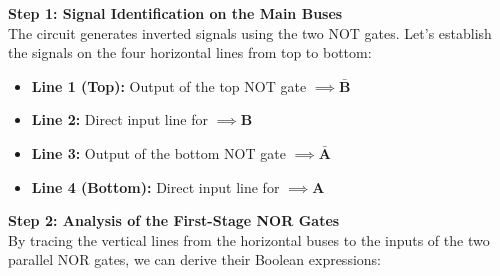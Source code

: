 \documentclass[12pt, a4paper]{article}
\begin{document}
																																																																																																																		\newpage %
																																																																																																																	
																																																																																																																		\begin{solutionbox}
																																																																																																																		    \textbf{Step 1: Signal Identification on the Main Buses} \\
																																																																																																																		        The circuit generates inverted signals using the two NOT gates. Let's establish the signals on the four horizontal lines from top to bottom:
																																																																																																																			    \begin{itemize}[itemsep=0.2em]
																																																																																																																			            \item \textbf{Line 1 (Top):} Output of the top NOT gate $\implies \mathbf{\bar{B}}$
																																																																																																																				            \item \textbf{Line 2:} Direct input line for $\implies \mathbf{B}$
																																																																																																																					            \item \textbf{Line 3:} Output of the bottom NOT gate $\implies \mathbf{\bar{A}}$
																																																																																																																						            \item \textbf{Line 4 (Bottom):} Direct input line for $\implies \mathbf{A}$
																																																																																																																							        \end{itemize}

																																																																																																																								    \vspace{0.3cm}
																																																																																																																								        \textbf{Step 2: Analysis of the First-Stage NOR Gates} \\
																																																																																																																									    By tracing the vertical lines from the horizontal buses to the inputs of the two parallel NOR gates, we can derive their Boolean expressions:
																																																																																																																									        

\end{solutionbox}
\end{document}
